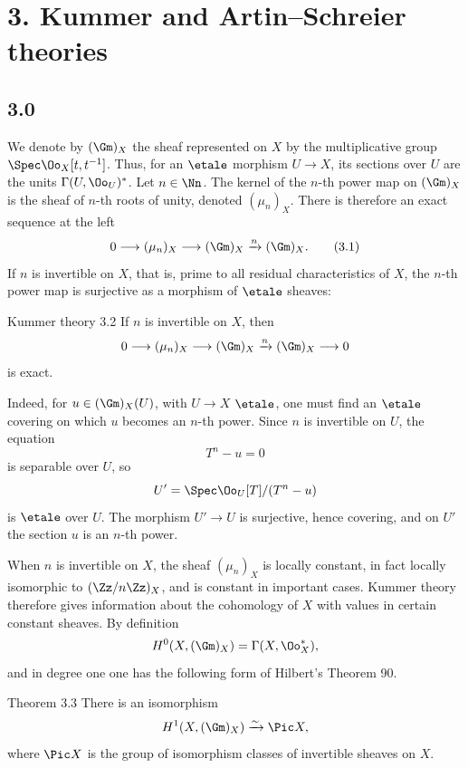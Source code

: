 \section*{3. Kummer and Artin--Schreier theories}

\subsection*{3.0}
We denote by \((\Gm)_X\) the sheaf represented on \(X\) by the multiplicative group
\(\Spec \Oo_X[t,t^{-1}]\). Thus, for an \(\etale\) morphism \(U\to X\), its sections over \(U\) are the units
\(\Gamma(U,\Oo_U)^*\). Let \(n\in\Nn\). The kernel of the \(n\)-th power map on \((\Gm)_X\) is the sheaf of \(n\)-th roots of unity, denoted \((\mu_n)_X\). There is therefore an exact sequence at the left
\[
0\longrightarrow (\mu_n)_X\longrightarrow (\Gm)_X\xrightarrow{n}(\Gm)_X .
\tag{3.1}
\]
If \(n\) is invertible on \(X\), that is, prime to all residual characteristics of \(X\), the \(n\)-th power map is surjective as a morphism of \(\etale\) sheaves:

\begin{statement}{Kummer theory 3.2}
If \(n\) is invertible on \(X\), then
\[
0\longrightarrow (\mu_n)_X\longrightarrow (\Gm)_X\xrightarrow{n}(\Gm)_X\longrightarrow 0
\]
is exact.
\end{statement}

Indeed, for \(u\in(\Gm)_X(U)\), with \(U\to X\) \(\etale\), one must find an \(\etale\) covering on which \(u\) becomes an \(n\)-th power. Since \(n\) is invertible on \(U\), the equation
\[
T^n-u=0
\]
is separable over \(U\), so
\[
U'=\Spec\Oo_U[T]/(T^n-u)
\]
is \(\etale\) over \(U\). The morphism \(U'\to U\) is surjective, hence covering, and on \(U'\) the section \(u\) is an \(n\)-th power.

When \(n\) is invertible on \(X\), the sheaf \((\mu_n)_X\) is locally constant, in fact locally isomorphic to \((\Zz/n\Zz)_X\), and is constant in important cases. Kummer theory therefore gives information about the cohomology of \(X\) with values in certain constant sheaves. By definition
\[
H^0(X,(\Gm)_X)=\Gamma(X,\Oo_X^*),
\]
and in degree one one has the following form of Hilbert's Theorem 90.

\begin{statement}{Theorem 3.3}
There is an isomorphism
\[
H^1(X,(\Gm)_X)\xrightarrow{\sim}\Pic X,
\]
where \(\Pic X\) is the group of isomorphism classes of invertible sheaves on \(X\).
\end{statement}

